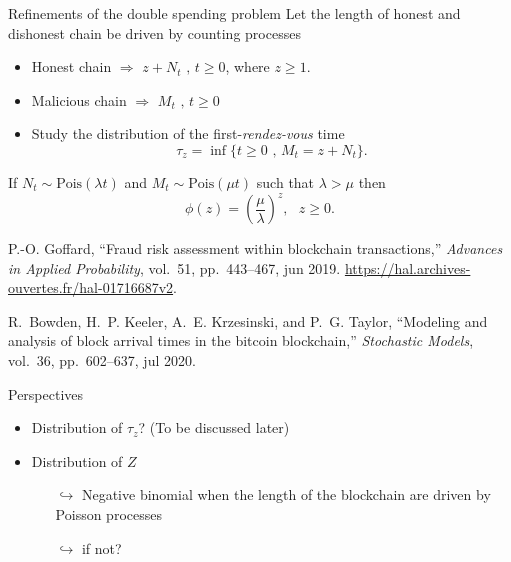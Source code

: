 \documentclass{beamer}
\begin{document}
\begin{frame}{Refinements of the double spending problem}
\scriptsize
Let the length of honest and dishonest chain be driven by counting processes
\begin{itemize}
\item Honest chain $\Rightarrow$ $z+N_t\text{ , }t\geq0$, where $z\geq1$.
\item Malicious chain $\Rightarrow$ $M_t\text{ , }t\geq0$
\item Study the distribution of the first-\textit{rendez-vous} time
$$
\tau_z=\inf\{t\geq0\text{ , } M_t=z+N_t\}.
$$
\end{itemize}
If $N_t\sim\text{Pois}(\lambda t)$ and $M_t\sim\text{Pois}(\mu t)$ such that $\lambda>\mu$ then 
$$
\phi(z) = \left(\frac{\mu}{\lambda}\right)^z,\text{ }z\geq 0.
$$
\tiny
\begin{thebibliography}{1}

P.-O. Goffard, ``Fraud risk assessment within blockchain transactions,'' {\em
  Advances in Applied Probability}, vol.~51, pp.~443--467, jun 2019.
\newblock \url{https://hal.archives-ouvertes.fr/hal-01716687v2}.

R.~Bowden, H.~P. Keeler, A.~E. Krzesinski, and P.~G. Taylor, ``Modeling and
  analysis of block arrival times in the bitcoin blockchain,'' {\em Stochastic
  Models}, vol.~36, pp.~602--637, jul 2020.
\end{thebibliography}

\end{frame}
\begin{frame}{Perspectives}
\begin{itemize}
\item Distribution of $\tau_z$? (To be discussed later)
\item Distribution of $Z$
\begin{itemize}
  \item[$\hookrightarrow$] Negative binomial when the length of the blockchain are driven by Poisson processes
  \item [$\hookrightarrow$] if not?
\end{itemize}
\end{itemize}
\end{frame}
\end{document}
